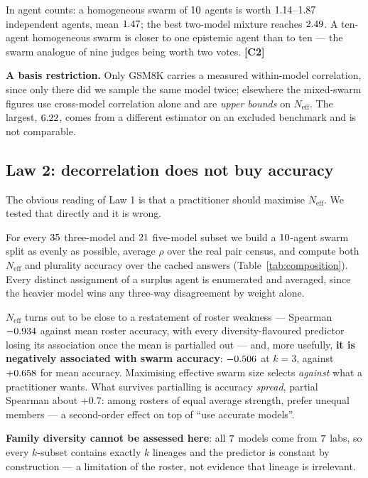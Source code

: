In agent counts: a homogeneous swarm of $10$ agents is worth
$1.14$--$1.87$ independent agents, mean $1.47$;
the best two-model mixture reaches $2.49$. A ten-agent homogeneous
swarm is closer to one epistemic agent than to ten --- the swarm analogue of nine
judges being worth two votes. \textbf{[C2]}

\textbf{A basis restriction.} Only GSM8K carries a measured within-model
correlation, since only there did we sample the same model twice; elsewhere the
mixed-swarm figures use cross-model correlation alone and are \emph{upper bounds}
on $N_{\mathrm{eff}}$. The largest, $6.22$, comes from a
different estimator on an excluded benchmark and is not comparable.

\subsection{Law 2: decorrelation does not buy accuracy}

The obvious reading of Law 1 is that a practitioner should maximise
$N_{\mathrm{eff}}$. We tested that directly and it is wrong.

For every $35$ three-model and $21$
five-model subset we build a $10$-agent swarm split as evenly as
possible, average $\rho$ over the real pair census, and compute both
$N_{\mathrm{eff}}$ and plurality accuracy over the cached answers
(Table~\ref{tab:composition}). Every distinct assignment of a surplus agent is
enumerated and averaged, since the heavier model wins any three-way disagreement
by weight alone.

$N_{\mathrm{eff}}$ turns out to be close to a restatement of roster weakness ---
Spearman $-0.934$ against mean roster accuracy, with every
diversity-flavoured predictor losing its association once the mean is partialled
out --- and, more usefully, \textbf{it is negatively associated with swarm
accuracy}: $-0.506$ at $k=3$, against $+0.658$ for mean
accuracy. Maximising effective swarm size selects \emph{against} what a
practitioner wants. What survives partialling is accuracy \emph{spread}, partial
Spearman about $+0.7$: among rosters of equal average strength, prefer unequal
members --- a second-order effect on top of ``use accurate models''.

\textbf{Family diversity cannot be assessed here}: all $7$ models come
from $7$ labs, so every $k$-subset contains exactly $k$ lineages and the
predictor is constant by construction --- a limitation of the roster, not
evidence that lineage is irrelevant.

